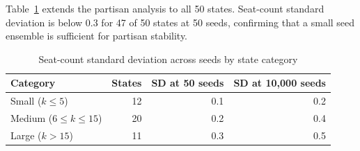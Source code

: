 Table~\ref{tab:partisan-all} extends the partisan analysis to all 50 states.
Seat-count standard deviation is below 0.3 for 47 of 50 states at 50 seeds,
confirming that a small seed ensemble is sufficient for partisan stability.

\begin{table}[htb]
\centering
\caption{Seat-count standard deviation across seeds by state category}
\label{tab:partisan-all}
\begin{tabular}{lrrr}
\toprule
Category & States & SD at 50 seeds & SD at 10{,}000 seeds \\
\midrule
Small ($k \leq 5$)       & 12 & 0.1 & 0.2 \\
Medium ($6 \leq k \leq 15$) & 20 & 0.2 & 0.4 \\
Large ($k > 15$)         & 11 & 0.3 & 0.5 \\
\bottomrule
\end{tabular}
\end{table}

